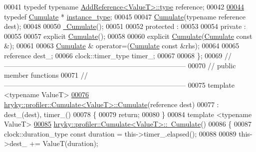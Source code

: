 \begin{DoxyCode}
00041     \textcolor{keyword}{typedef} \textcolor{keyword}{typename} \hyperlink{classhryky_1_1_add_reference_a4b90c1381625432ba6152b7388bc4399}{AddReference<ValueT>::type}     reference;
00042 
\hypertarget{profiler__cumulate_8h_source_l00044}{}\hyperlink{classhryky_1_1profiler_1_1_cumulate_a2f40d09f296a528c8b8fd707b3681534}{00044}     \textcolor{keyword}{typedef} \hyperlink{classhryky_1_1profiler_1_1_cumulate}{Cumulate} * \hyperlink{classhryky_1_1profiler_1_1_cumulate_a2f40d09f296a528c8b8fd707b3681534}{instance_type};
00045 
00047     \hyperlink{classhryky_1_1profiler_1_1_cumulate}{Cumulate}(\textcolor{keyword}{typename} reference dest);
00048 
00050     \hyperlink{classhryky_1_1profiler_1_1_cumulate_aa0f40543187530e3cc2f3deb50a85726}{~Cumulate}();
00051 
00052 \textcolor{keyword}{protected} :
00053 
00054 \textcolor{keyword}{private} :
00055 
00057     \textcolor{keyword}{explicit} \hyperlink{classhryky_1_1profiler_1_1_cumulate}{Cumulate}();
00058 
00060     \textcolor{keyword}{explicit} \hyperlink{classhryky_1_1profiler_1_1_cumulate}{Cumulate}(\hyperlink{classhryky_1_1profiler_1_1_cumulate}{Cumulate} \textcolor{keyword}{const} &);
00061 
00063     \hyperlink{classhryky_1_1profiler_1_1_cumulate}{Cumulate} & operator=(\hyperlink{classhryky_1_1profiler_1_1_cumulate}{Cumulate} \textcolor{keyword}{const} &rhs);
00064 
00065     reference           dest\_;  
00066     clock::timer\_type   timer\_; 
00067 
00068 \};
00069 \textcolor{comment}{//
      ------------------------------------------------------------------------------}
00070 \textcolor{comment}{// public member functions}
00071 \textcolor{comment}{//
      ------------------------------------------------------------------------------}
00075 \textcolor{comment}{}\textcolor{keyword}{template} <\textcolor{keyword}{typename} ValueT>
\hypertarget{profiler__cumulate_8h_source_l00076}{}\hyperlink{classhryky_1_1profiler_1_1_cumulate_a7dc86263b187cbd5fd60da1e4c3a442b}{00076} \hyperlink{classhryky_1_1profiler_1_1_cumulate}{hryky::profiler::Cumulate<ValueT>::Cumulate}(reference dest)
00077     : dest\_(dest), timer\_()
00078 \{
00079     \textcolor{keywordflow}{return};
00080 \}
00084 \textcolor{keyword}{template} <\textcolor{keyword}{typename} ValueT>
\hypertarget{profiler__cumulate_8h_source_l00085}{}\hyperlink{classhryky_1_1profiler_1_1_cumulate_aa0f40543187530e3cc2f3deb50a85726}{00085} \hyperlink{classhryky_1_1profiler_1_1_cumulate}{hryky::profiler::Cumulate<ValueT>::~Cumulate}()
00086 \{
00087     clock::duration\_type \textcolor{keyword}{const} duration = this->timer\_.elapsed();
00088 
00089     this->dest\_ += ValueT(duration);

\end{DoxyCode}
